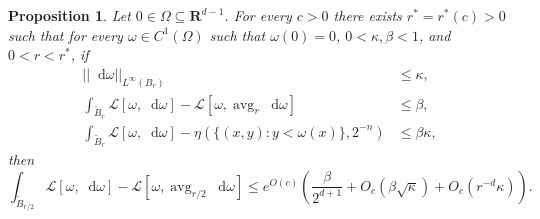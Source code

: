\documentclass[reqno,12pt,letterpaper]{amsart}
\newcommand{\RR}{\mathbf{R}}
\DeclareMathOperator{\avg}{avg}
\newcommand*\dif{\mathop{}\!\mathrm{d}}
\newcommand{\Lagrange}{\mathscr L}
\newtheorem{proposition}[theorem]{Proposition}
\theoremstyle{definition}
\numberwithin{equation}{section}
\begin{document}
\begin{proposition}\label{dGL Laplace}
Let $0 \in \Omega \subseteq \RR^{d - 1}$. For every $c > 0$ there exists $r^* = r^*(c) > 0$ such that for every $\omega \in C^1(\Omega)$ such that $\omega(0) = 0$, $0 < \kappa, \beta < 1$, and $0 < r < r^*$, if
\begin{align}
||\dif \omega||_{L^\infty(B_r)} &\leq \kappa \label{bound on gradient}, \\
\int_{\tilde B_r} \Lagrange[\omega, \dif \omega] - \Lagrange[\omega, \avg_r \dif \omega] &\leq \beta, \label{bound on mean oscillation} \\
\int_{\tilde B_r} \Lagrange[\omega, \dif \omega] - \eta(\{(x, y): y < \omega(x)\}, 2^{-n}) &\leq \beta\kappa \label{bound on surface area},
\end{align}
then
\begin{equation} \label{dGL Laplace gain}
\int_{\tilde B_{r/2}} \Lagrange[\omega, \dif \omega] - \Lagrange[\omega, \avg_{r/2} \dif \omega] \leq e^{O(c)}\left(\frac{\beta}{2^{d + 1}} + O_c(\beta \sqrt \kappa) + O_c(r^{-d} \kappa)\right).
\end{equation}
\end{proposition}
\end{document}
